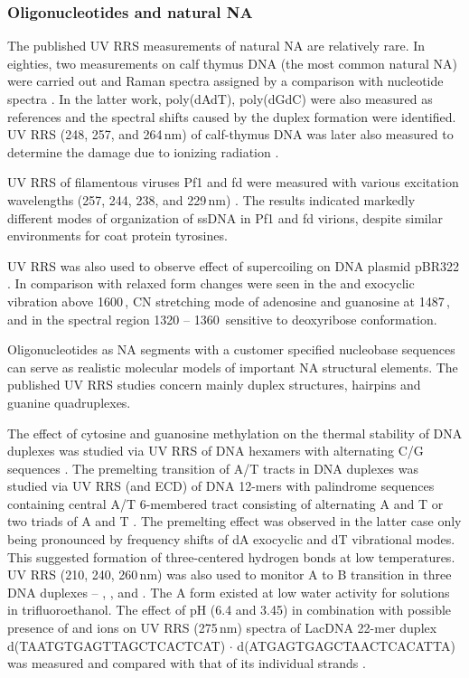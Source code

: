 \subsubsection{Oligonucleotides and natural NA}

The published UV RRS measurements of natural NA are relatively rare.
In eighties, two measurements on calf thymus DNA (the most common natural NA)
were carried out and Raman spectra assigned by a comparison with nucleotide
spectra
\parencite{%
	Laigle1982a,%
	Fodor1986a%
}.
In the latter work, poly(dAdT), poly(dGdC) were also measured as references and
the spectral shifts caused by the duplex formation were identified.
UV RRS (248, 257, and 264\,nm) of calf-thymus DNA was later also measured to
determine the damage due to ionizing radiation
\parencite{Shaw2009}.

UV RRS of filamentous viruses Pf1 and fd were measured with various excitation
wavelengths (257, 244, 238, and 229\,nm)
\parencite{Wen1999}.
The results indicated markedly different modes of organization of ssDNA in Pf1
and fd virions, despite similar environments for coat protein tyrosines.

UV RRS was also used to observe effect of supercoiling on DNA plasmid pBR322
\parencite{Neugebauer2007}.
In comparison with relaxed form changes were seen in the  and exocyclic
 vibration above 1600\,\icm{}, CN stretching mode of adenosine and
guanosine at 1487\,\icm{}, and in the spectral region 1320 -- 1360\,\icm{}
sensitive to deoxyribose conformation.

Oligonucleotides as NA segments with a customer specified nucleobase sequences
can serve as realistic molecular models of important NA structural elements.
The published UV RRS studies concern mainly duplex structures, hairpins and
guanine quadruplexes.

The effect of cytosine and guanosine methylation on the thermal stability of
DNA duplexes was studied via UV RRS of DNA hexamers with alternating C/G
sequences
\parencite{%
	Laigle1986,%
	Chinsky1987%
}.
\textcite{Mukerji2002}
The premelting transition of A/T tracts in DNA duplexes was studied
via UV RRS (and ECD) of DNA 12-mers with palindrome sequences containing
central A/T 6-membered tract consisting of alternating A and T or two triads of
A and T
\parencite{Mukerji2002}.
The premelting effect was observed in the latter case only being pronounced by
frequency shifts of dA exocyclic  and dT 
vibrational modes.
This suggested formation of three-centered hydrogen bonds at low temperatures.
UV RRS (210, 240, 260\,nm) was also used to monitor A to B transition in three
DNA duplexes --
	,
	,
	and 
\parencite{Knee2008}.
The A form existed at low water activity for solutions in trifluoroethanol.
The effect of pH (6.4 and 3.45) in combination with possible presence of
 and  ions on UV RRS (275\,nm) spectra of LacDNA 22-mer
duplex
	d(TAATGTGAGTT\allowbreak{}AGCTCACTCAT)%
	$\cdot$%
	d(ATGAGTGAGCT\allowbreak{}AACTCACATTA)
was measured
and compared with that of its individual strands
\parencite{Muntean2013}.

